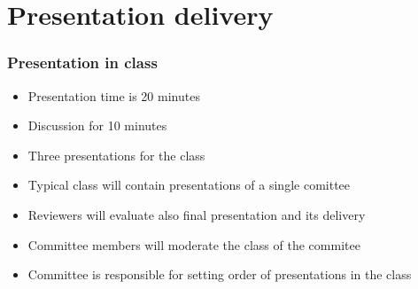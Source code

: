\section{Presentation delivery}

\begin{frame}
\frametitle{Presentation in class}
\begin{itemize}
\item Presentation time is 20 minutes
\item Discussion for 10 minutes
\item Three presentations for the class
\item Typical class will contain presentations of a single comittee
\item Reviewers will evaluate also final presentation and its delivery
\item Committee members will moderate the class of the commitee
\item Committee is responsible for setting order of presentations in the class
\end{itemize}
\end{frame}

